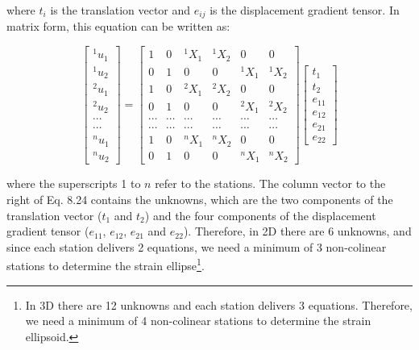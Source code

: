\documentclass[a4paper , 12pt]{book}
\begin{document}
where $t_i$ is the translation vector and $e_{ij}$ is the displacement gradient tensor. In matrix form, this equation can be written as:

\begin{equation}
    \left[\begin{array}{c}{ }^{1} u_1 \\ { }^{1} u_{2} \\ { }^{2} u_{1} \\ { }^{2} u_{2} \\ \cdots \\ \cdots \\ { }^{n} u_{1} \\ { }^{n} u_{2}\end{array}\right]=\left[\begin{array}{cccccc}1 & 0 & { }^{1} X_{1} & { }^{1} X_{2} & 0 & 0 \\ 0 & 1 & 0 & 0 & { }^{1} X_{1} & { }^{1} X_{2} \\ 1 & 0 & { }^{2} X_{1} & { }^{2} X_{2} & 0 & 0 \\ 0 & 1 & 0 & 0 & { }^{2} X_{1} & { }^{2} X_{2} \\ \cdots & \cdots & \cdots & \cdots & \cdots & \cdots \\ \cdots & \cdots & \cdots & \cdots & \cdots & \cdots \\ 1 & 0 & { }^{n} X_{1} & { }^{n} X_{2} & 0 & 0 \\ 0 & 1 & 0 & 0 & { }^{n} X_{1} & { }^{n} X_{2}\end{array}\right]\left[\begin{array}{l}t_{1} \\ t_{2} \\ e_{11} \\ e_{12} \\ e_{21} \\ e_{22}\end{array}\right]
\end{equation}

where the superscripts 1 to $n$ refer to the stations. The column vector to the right of Eq. 8.24 contains the unknowns, which are the two components of the translation vector ($t_1$ and $t_2$) and the four components of the displacement gradient tensor ($e_{11}$, $e_{12}$, $e_{21}$ and $e_{22}$). Therefore, in 2D there are 6 unknowns, and since each station delivers 2 equations, we need a minimum of 3 non-colinear stations to determine the strain ellipse\footnote{In 3D there are 12 unknowns and each station delivers 3 equations. Therefore, we need a minimum of 4 non-colinear stations to determine the strain ellipsoid.}.
\end{document}
